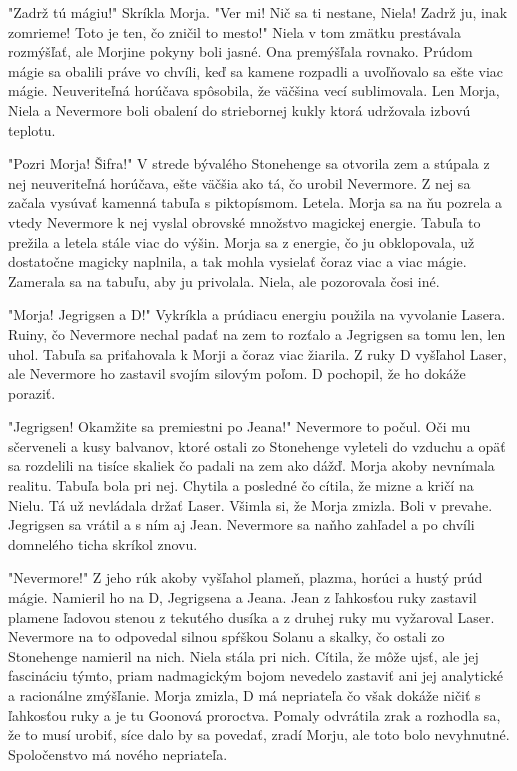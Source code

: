 \documentclass{book}
\begin{document}
"Zadrž tú mágiu!"$ $ Skríkla Morja. "Ver mi! Nič sa ti nestane, Niela! Zadrž ju, inak zomrieme! Toto je ten, čo zničil to mesto!"$ $ Niela v tom zmätku prestávala rozmýšľať, ale Morjine pokyny boli jasné. Ona premýšľala rovnako. Prúdom mágie sa obalili práve vo chvíli, keď sa kamene rozpadli a uvoľňovalo sa ešte viac mágie. Neuveriteľná horúčava spôsobila, že väčšina vecí sublimovala. Len Morja, Niela a Nevermore boli obalení do striebornej kukly ktorá udržovala izbovú teplotu.

"Pozri Morja! Šifra!"$ $ V strede bývalého Stonehenge sa otvorila zem a stúpala z nej neuveriteľná horúčava, ešte väčšia ako tá, čo urobil Nevermore. Z nej sa začala vysúvať kamenná tabuľa s piktopísmom. Letela. Morja sa na ňu pozrela a vtedy Nevermore k nej vyslal obrovské množstvo magickej energie. Tabuľa to prežila a letela stále viac do výšin. Morja sa z energie, čo ju obklopovala, už dostatočne magicky naplnila, a tak mohla vysielať čoraz viac a viac mágie. Zamerala sa na tabuľu, aby ju privolala. Niela, ale pozorovala čosi iné.

"Morja! Jegrigsen a D!"$ $ Vykríkla a prúdiacu energiu použila na vyvolanie Lasera. Ruiny, čo Nevermore nechal padať na zem to rozťalo a Jegrigsen sa tomu len, len uhol. Tabuľa sa priťahovala k Morji a čoraz viac žiarila. Z ruky D vyšľahol Laser, ale Nevermore ho zastavil svojím silovým poľom. D pochopil, že ho dokáže poraziť.

"Jegrigsen! Okamžite sa premiestni po Jeana!"$ $ Nevermore to počul. Oči mu sčerveneli a kusy balvanov, ktoré ostali zo Stonehenge vyleteli do vzduchu a opäť sa rozdelili na tisíce skaliek čo padali na zem ako dážď. Morja akoby nevnímala realitu. Tabuľa bola pri nej. Chytila a posledné čo cítila, že mizne a kričí na Nielu. Tá už nevládala držať Laser. Všimla si, že Morja zmizla. Boli v prevahe. Jegrigsen sa vrátil a s ním aj Jean. Nevermore sa naňho zahľadel a po chvíli domnelého ticha skríkol znovu.

"Nevermore!"$ $ Z jeho rúk akoby vyšľahol plameň, plazma, horúci a hustý prúd mágie. Namieril ho na D, Jegrigsena a Jeana. Jean z ľahkosťou ruky zastavil plamene ľadovou stenou z tekutého dusíka a z druhej ruky mu vyžaroval Laser. Nevermore na to odpovedal silnou spŕškou Solanu a skalky, čo ostali zo Stonehenge namieril na nich. Niela stála pri nich. Cítila, že môže ujsť, ale jej fascináciu týmto, priam nadmagickým bojom nevedelo zastaviť ani jej analytické a racionálne zmýšľanie. Morja zmizla, D má nepriateľa čo však dokáže ničiť s ľahkosťou ruky a je tu Goonová proroctva. Pomaly odvrátila zrak a rozhodla sa, že to musí urobiť, síce dalo by sa povedať, zradí Morju, ale toto bolo nevyhnutné. Spoločenstvo má nového nepriateľa.
\end{document}
